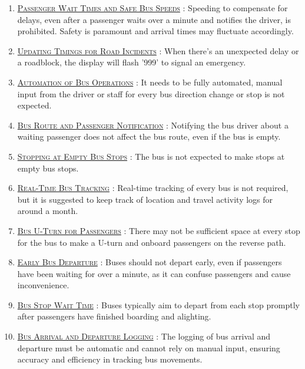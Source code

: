 \begin{enumerate}
    \item \underline{\textsc{Passenger Wait Times and Safe Bus Speeds}} : Speeding to compensate for delays, even after a passenger waits over a minute and notifies the driver, is prohibited. Safety is paramount and arrival times may fluctuate accordingly.
    
    \item \underline{\textsc{Updating Timings for Road Incidents}} : When there's an unexpected delay or a roadblock, the display will flash '999' to signal an emergency.
    
    \item \underline{\textsc{Automation of Bus Operations}} :  It needs to be fully automated, manual input from the driver or staff for every bus direction change or stop is not expected.
    
    \item \underline{\textsc{Bus Route and Passenger Notification}} : Notifying the bus driver about a waiting passenger does not affect the bus route, even if the bus is empty.
    
    \item \underline{\textsc{Stopping at Empty Bus Stops}} : The bus is not expected to make stops at empty bus stops.
    
    \item \underline{\textsc{Real-Time Bus Tracking}} : Real-time tracking of every bus is not required, but it is suggested to keep track of location and travel activity logs for around a month.
    
    \item \underline{\textsc{Bus U-Turn for Passengers}} : There may not be sufficient space at every stop for the bus to make a U-turn and onboard passengers on the reverse path.
    
    \item \underline{\textsc{Early Bus Departure}} : Buses should not depart early, even if passengers have been waiting for over a minute, as it can confuse passengers and cause inconvenience.
    
    \item \underline{\textsc{Bus Stop Wait Time}} : Buses typically aim to depart from each stop promptly after passengers have finished boarding and alighting.
    
    \item \underline{\textsc{Bus Arrival and Departure Logging}} : The logging of bus arrival and departure must be automatic and cannot rely on manual input, ensuring accuracy and efficiency in tracking bus movements.
    

\end{enumerate}
